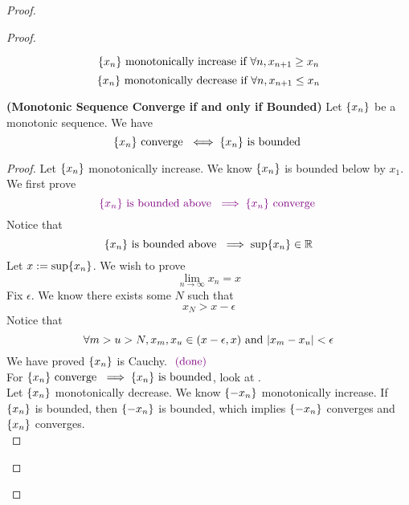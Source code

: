 \documentclass{report}
\begin{document}
\begin{proof}
\begin{proof}
\begin{definition}
\begin{equation}
\{ x_n \}\text{ monotonically increase if }\forall n, x_{n+1}\geq x_n
\end{equation}
\begin{equation}
\{ x_n \}\text{ monotonically decrease if }\forall n, x_{n+1}\leq x_n
\end{equation}
\end{definition}
\begin{theorem}
\label{4.2.10}
\textbf{(Monotonic Sequence Converge if and only if Bounded)} Let $\{ x_n \}$ be a monotonic sequence. We have
\begin{equation}
\{ x_n \}\text{ converge }\iff \{ x_n \}\text{ is bounded }
\end{equation}
\end{theorem}
\begin{proof}
Let $\{ x_n \}$ monotonically increase. We know $\{ x_n \}$ is bounded below by $x_1$. We first prove
\begin{equation}
  \textcolor{violet}{\{ x_n \}\text{ is bounded above }\implies \{ x_n \}\text{ converge }}
\end{equation}
Notice that
\begin{equation}
\{ x_n \}\text{ is bounded above }\implies \sup \{ x_n \}\in\mathbb{R}
\end{equation}
Let $x:=\sup \{ x_n \}$. We wish to prove
\begin{equation}
\lim_{n\to\infty}x_n=x
\end{equation}
Fix $\epsilon $. We know there exists some $N$ such that
 \begin{equation}
x_N>x-\epsilon 
\end{equation}
Notice that
\begin{equation}
\forall m>u>N, x_m,x_u\in (x-\epsilon ,x)\text{ and }|x_m-x_u|<\epsilon 
\end{equation}
We have proved $\{ x_n \}$ is Cauchy. $\textcolor{violet}{\text{ (done) }}$\\


For $\{ x_n \}\text{ converge }\implies \{ x_n \}\text{ is bounded}$, look at .\\

Let $\{ x_n \}$ monotonically decrease. We know $\{ -x_n \}$ monotonically increase. If $\{ x_n \}$ is bounded, then $\{ -x_n \}$ is bounded, which implies $\{ -x_n \}$ converges and $\{ x_n \}$ converges.\\


\end{proof}
\end{proof}
\end{proof}
\end{document}
